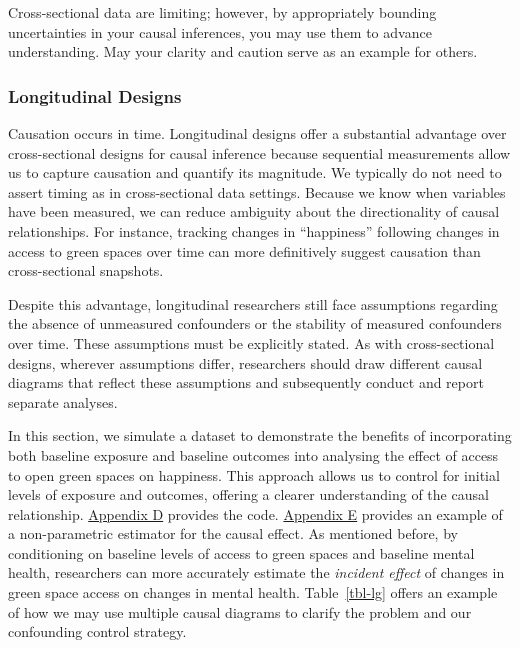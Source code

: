 \documentclass[
  single column]{article}
\begin{document}
Cross-sectional data are limiting; however, by appropriately bounding
uncertainties in your causal inferences, you may use them to advance
understanding. May your clarity and caution serve as an example for
others.

\subsubsection{Longitudinal Designs}\label{longitudinal-designs}

Causation occurs in time. Longitudinal designs offer a substantial
advantage over cross-sectional designs for causal inference because
sequential measurements allow us to capture causation and quantify its
magnitude. We typically do not need to assert timing as in
cross-sectional data settings. Because we know when variables have been
measured, we can reduce ambiguity about the directionality of causal
relationships. For instance, tracking changes in ``happiness'' following
changes in access to green spaces over time can more definitively
suggest causation than cross-sectional snapshots.

Despite this advantage, longitudinal researchers still face assumptions
regarding the absence of unmeasured confounders or the stability of
measured confounders over time. These assumptions must be explicitly
stated. As with cross-sectional designs, wherever assumptions differ,
researchers should draw different causal diagrams that reflect these
assumptions and subsequently conduct and report separate analyses.

In this section, we simulate a dataset to demonstrate the benefits of
incorporating both baseline exposure and baseline outcomes into
analysing the effect of access to open green spaces on happiness. This
approach allows us to control for initial levels of exposure and
outcomes, offering a clearer understanding of the causal relationship.
\hyperref[appendix-d-simulation-of-different-confounding-control-strategies]{Appendix
D} provides the code.
\hyperref[appendix-e-non-parametric-estimation-of-average-treatment-effects-using-causal-forests]{Appendix
E} provides an example of a non-parametric estimator for the causal
effect. As mentioned before, by conditioning on baseline levels of
access to green spaces and baseline mental health, researchers can more
accurately estimate the \emph{incident effect} of changes in green space
access on changes in mental health. Table~\ref{tbl-lg} offers an example
of how we may use multiple causal diagrams to clarify the problem and
our confounding control strategy.
\end{document}
